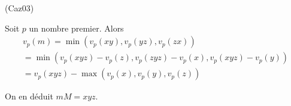 \begin{tiny}(Caz03)\end{tiny} Soit $p$ un nombre premier. Alors
\begin{multline*}
 v_p(m) = \min(v_p(xy),v_p(yz),v_p(zx))\\
 = \min(v_p(xyz)-v_p(z),v_p(zyz)-v_p(x),v_p(xyz)-v_p(y))\\
 = v_p(xyz) - \max(v_p(x),v_p(y),v_p(z))
\end{multline*}

On en déduit $mM=xyz$.
